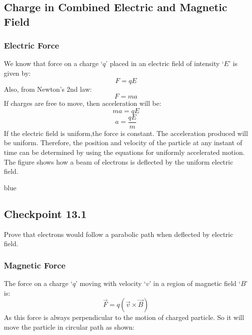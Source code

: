 \subsection{Charge in Combined Electric and Magnetic Field}
\subsubsection{Electric Force}
We know that force on a charge ‘$q$’ placed in an electric field of intensity ‘$E$’ is given by:
\begin{equation}\label{eq:13.31}
    F=q E
\end{equation}
Also, from Newton’s 2nd law:
\begin{equation}\label{eq:13.32}
    F=ma
\end{equation}
If charges are free to move, then acceleration will be:
\begin{equation}\nonumber
    ma=q E
\end{equation}\label{eq:13.33}
\begin{equation}
    a=\frac{q E}{m}
\end{equation}
If the electric field is uniform,the force is constant. The acceleration produced will be uniform. Therefore, the position and velocity of the particle at any instant of time can be determined by using the equations for uniformly accelerated motion. The figure shows how a beam of electrons is deflected by the uniform electric field.

\begin{mybox}{blue}{}
\subsection*{\checkpoint{} Checkpoint 13.1}
Prove that electrons would follow a parabolic path when deflected by electric field.
\end{mybox}
\subsubsection{Magnetic Force}
The force on a charge ‘$q$’ moving with velocity ‘$v$’ in a region of magnetic field ‘$B$’ is:
\begin{equation}\nonumber
    \vec{F}=q(\vec{v} \times \vec{B})
\end{equation}
As this force is always perpendicular to the motion of charged particle. So it will move the particle in circular path as shown:

